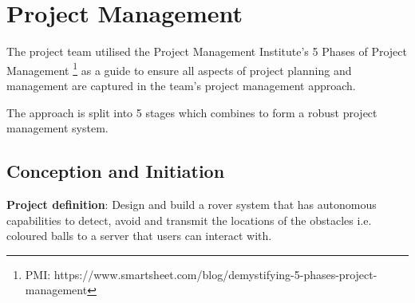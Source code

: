 \documentclass[11pt, a4paper]{article}
\begin{document}
\tableofcontents
\pagebreak

\section{Project Management}

The project team utilised the Project Management Institute's 5 Phases of Project Management \footnote{PMI: https://www.smartsheet.com/blog/demystifying-5-phases-project-management} as a guide to ensure all aspects of project planning and management are captured in the team's project management approach. 

The approach is split into 5 stages which combines to form a robust project management system.

\subsection{Conception and Initiation}

\textbf{Project definition}: Design and build a rover system that has autonomous capabilities to detect, avoid and transmit the locations of the obstacles i.e. coloured balls to a server that users can interact with.
\end{document}
